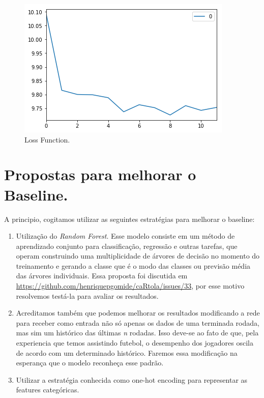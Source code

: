 \documentclass[conference]{IEEEtran}
\begin{document}
\begin{figure}
  \includegraphics[width=\linewidth]{loss_function.png}
  \caption{Loss Function.}
  \label{fig:boat1}
\end{figure}

\section{Propostas para melhorar o Baseline.}

A  principio,  cogitamos  utilizar   as  seguintes  estratégias  para
melhorar o baseline:

\begin{enumerate}

\item Utilização do \textit{Random  Forest}. Esse modelo consiste em
um método  de aprendizado  conjunto para  classificação, regressão
e  outras  tarefas,  que  operam  construindo  uma  multiplicidade  de
árvores  de   decisão  no  momento   do  treinamento  e   gerando  a
classe   que   é   o   modo   das   classes   ou   previsão   média
das   árvores   individuais.   Essa   proposta   foi   discutida   em
\url{https://github.com/henriquepgomide/caRtola/issues/33},  por  esse
motivo resolvemos testá-la para avaliar os resultados.

\item  Acreditamos   também  que   podemos  melhorar   os  resultados
modificando a rede para receber como  entrada não só apenas os dados
de uma terminada rodada, mas sim um histórico das últimas \textit{n}
rodadas.  Isso deve-se  ao fato  de  que, pela  experiencia que  temos
assistindo futebol, o desempenho dos jogadores oscila de acordo com um
determinado histórico. Faremos essa modificação na esperança que o
modelo reconheça esse padrão.

\item  Utilizar a  estratégia  conhecida como  one-hot encoding  para
representar as features categóricas.

\end{enumerate}
\end{document}
